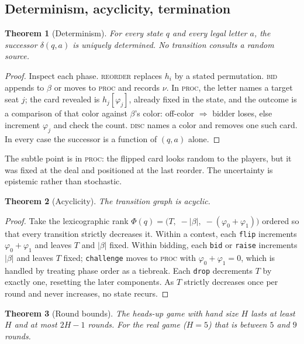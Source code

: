 \documentclass[11pt]{article}
\theoremstyle{plain}
\newtheorem{theorem}{Theorem}[section]
\theoremstyle{definition}
\theoremstyle{remark}
\newcommand{\dtrans}{\ensuremath{\delta}}
\newcommand{\code}[1]{\texttt{\small #1}}
\begin{document}
\subsection{Determinism, acyclicity, termination}

\begin{theorem}[Determinism]\label{thm:det}
For every state $q$ and every legal letter $a$, the successor
$\dtrans(q,a)$ is uniquely determined. No transition consults a random
source.
\end{theorem}

\begin{proof}
Inspect each phase. \textsc{reorder} replaces $h_i$ by a stated
permutation. \textsc{bid} appends to $\beta$ or moves to \textsc{proc} and
records $\nu$. In \textsc{proc}, the letter names a target seat $j$; the
card revealed is $h_j[\varphi_j]$, already fixed in the state, and the
outcome is a comparison of that color against $\beta$'s color: off-color
$\Rightarrow$ bidder loses, else increment $\varphi_j$ and check the count.
\textsc{disc} names a color and removes one such card. In every case the
successor is a function of $(q,a)$ alone.
\end{proof}

The subtle point is in \textsc{proc}: the flipped card looks random to the
players, but it was fixed at the deal and positioned at the last reorder.
The uncertainty is epistemic rather than stochastic.

\begin{theorem}[Acyclicity]\label{thm:acyclic}
The transition graph is acyclic.
\end{theorem}

\begin{proof}
Take the lexicographic rank $\Phi(q)=\bigl(T,\;-|\beta|,\;
-(\varphi_0+\varphi_1)\bigr)$ ordered so that every transition strictly
decreases it. Within a contest, each \code{flip} increments
$\varphi_0+\varphi_1$ and leaves $T$ and $|\beta|$ fixed. Within bidding,
each \code{bid} or \code{raise} increments $|\beta|$ and leaves $T$ fixed;
\code{challenge} moves to \textsc{proc} with $\varphi_0+\varphi_1=0$, which
is handled by treating phase order as a tiebreak. Each \code{drop}
decrements $T$ by exactly one, resetting the later components. As $T$
strictly decreases once per round and never increases, no state recurs.
\end{proof}

\begin{theorem}[Round bounds]\label{thm:rounds}
The heads-up game with hand size $H$ lasts at least $H$ and at most $2H-1$
rounds. For the real game ($H=5$) that is between $5$ and $9$ rounds.
\end{theorem}
\end{document}
